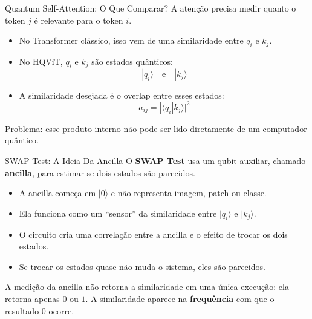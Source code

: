 \begin{frame}{Quantum Self-Attention: O Que Comparar?}
    A atenção precisa medir quanto o token $j$ é relevante para o token $i$.
    \begin{itemize}
        \item No Transformer clássico, isso vem de uma similaridade entre $q_i$ e $k_j$.
        \item No HQViT, $q_i$ e $k_j$ são estados quânticos:
        \[
            |q_i\rangle \quad \text{e} \quad |k_j\rangle
        \]
        \item A similaridade desejada é o overlap entre esses estados:
        \[
            a_{ij} = |\langle q_i | k_j \rangle|^2
        \]
    \end{itemize}
    \vspace{0.3em}
    Problema: esse produto interno não pode ser lido diretamente de um computador quântico.
\end{frame}

\begin{frame}{SWAP Test: A Ideia Da Ancilla}
    O \textbf{SWAP Test} usa um qubit auxiliar, chamado \textbf{ancilla}, para estimar se dois estados são parecidos.
    \begin{itemize}
        \item A ancilla começa em $|0\rangle$ e não representa imagem, patch ou classe.
        \item Ela funciona como um ``sensor'' da similaridade entre $|q_i\rangle$ e $|k_j\rangle$.
        \item O circuito cria uma correlação entre a ancilla e o efeito de trocar os dois estados.
        \item Se trocar os estados quase não muda o sistema, eles são parecidos.
    \end{itemize}

    \vspace{0.3em}
    A medição da ancilla não retorna a similaridade em uma única execução: ela retorna apenas $0$ ou $1$.
    A similaridade aparece na \textbf{frequência} com que o resultado $0$ ocorre.
\end{frame}

